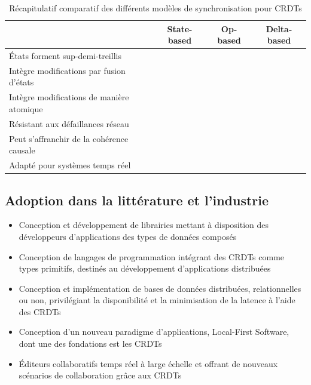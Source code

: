 \documentclass[12pt]{thesul}
\renewcommand{\checkmark}{\ding{51}}
\newcommand{\ballotx}{\ding{55}}
\begin{document}
\begin{table}[!ht]
  \centering
  \caption{Récapitulatif comparatif des différents modèles de synchronisation pour \acp{CRDT}}
  \label{tab:synchronisation-models}
    \begin{tabular}{lccc}
      \toprule
                                                & State-based & Op-based    & Delta-based \\
      \midrule
      États forment sup-demi-treillis           & \checkmark  & \checkmark  & \checkmark  \\
      Intègre modifications par fusion d'états  & \checkmark  & \ballotx    & \checkmark  \\
      Intègre modifications de manière atomique & \ballotx    & \checkmark  & \checkmark  \\
      Résistant aux défaillances réseau         & \checkmark  & \ballotx    & \checkmark  \\
      Peut s'affranchir de la cohérence causale & \ballotx    & \checkmark  & \checkmark  \\
      Adapté pour systèmes temps réel           & \ballotx    & \checkmark  & \checkmark  \\
      \bottomrule
    \end{tabular}
\end{table}

\subsection{Adoption dans la littérature et l'industrie}


\begin{itemize}
  \item Conception et développement de librairies mettant à disposition des développeurs d'applications des types de données composés \cite{Nicolaescu2015Yjs, Nicolaescu2016YATA, yjsimplem, jsoncrdt2017, automerge}
  \item Conception de langages de programmation intégrant des CRDTs comme types primitifs, destinés au développement d'applications distribuées \cite{Meiklejohn2015Lasp2, DePorre2020cscript}
  \item Conception et implémentation de bases de données distribuées, relationnelles ou non, privilégiant la disponibilité et la minimisation de la latence à l'aide des CRDTs \cite{RiakKV, AntidoteDB, Anna2021, Concordant, yu:hal-02983557}
  \item Conception d'un nouveau paradigme d'applications, Local-First Software, dont une des fondations est les CRDTs \cite{localfirstsoftware2019, pushpin2020}
  \item Éditeurs collaboratifs temps réel à large échelle et offrant de nouveaux scénarios de collaboration grâce aux CRDTs \cite{Nedelec2016CRATE, MUTE2017}
\end{itemize}
\end{document}
